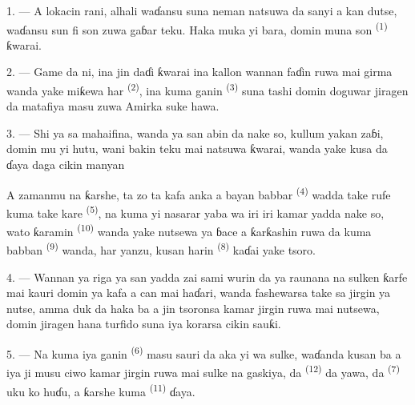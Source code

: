 \VUsaut{4.0mm}
\VUsaut{3.0mm}
\VUsaut{3.0mm}

1. --- A lokacin rani, alhali waɗansu suna neman natsuwa da sanyi a
kan dutse, waɗansu sun fi son zuwa gaɓar teku. Haka muka yi bara,
domin muna son  \textsuperscript{(1)} ƙwarai.

2. --- Game da ni, ina jin daɗi ƙwarai ina kallon wannan faɗin ruwa
mai girma wanda yake miƙewa har 
\textsuperscript{(2)}, ina kuma ganin  \textsuperscript{(3)} suna tashi domin doguwar 
jiragen da matafiya masu zuwa Amirka suke hawa.

3. --- Shi ya sa mahaifina, wanda ya san abin da nake so, kullum yakan
zaɓi, domin mu yi hutu, wani bakin teku mai natsuwa ƙwarai, wanda yake
kusa da ɗaya daga cikin manyan 

A zamanmu na ƙarshe,  ta zo ta kafa anka
a bayan babbar  \textsuperscript{(4)} wadda take rufe
kuma take kare 
\textsuperscript{(5)}, na kuma yi nasarar yaba wa  iri iri kamar yadda nake so, wato ƙaramin  \textsuperscript{(10)} wanda yake nutsewa ya ɓace a ƙarƙashin
ruwa da kuma babban  \textsuperscript{(9)}
wanda, har yanzu, kusan harin 
\textsuperscript{(8)} kaɗai yake tsoro.

\VUsaut{3.0mm}
\VUsaut{3.0mm}

4. --- Wannan ya riga ya san yadda zai sami wurin da ya raunana na
sulken ƙarfe mai kauri  domin ya kafa a can
 mai haɗari, wanda fashewarsa take sa jirgin ya nutse,
amma duk da haka ba a jin tsoronsa kamar jirgin ruwa mai nutsewa,
domin jiragen hana turfido suna iya korarsa cikin sauƙi.

5. --- Na kuma iya ganin  \textsuperscript{(6)}
masu sauri da aka yi wa sulke, waɗanda kusan ba a iya ji musu ciwo
kamar jirgin ruwa mai sulke na gaskiya, da 
\textsuperscript{(12)} da yawa, da 
\textsuperscript{(7)} uku ko huɗu, a ƙarshe kuma 
\textsuperscript{(11)} ɗaya. 


